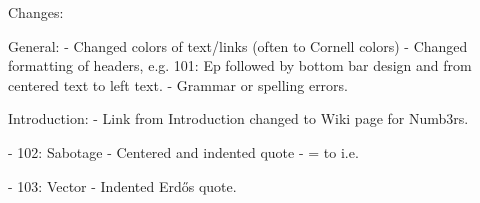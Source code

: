 Changes:

General:
- Changed colors of text/links (often to Cornell colors)
- Changed formatting of headers, e.g. 101: Ep followed by bottom bar design and from centered text to left text. 
- Grammar or spelling errors.

Introduction: 
- Link from Introduction changed to Wiki page for Numb3rs.





- 102: Sabotage
	- Centered and indented quote
	- = to i.e.

- 103: Vector
	- Indented Erd\H{o}s quote.